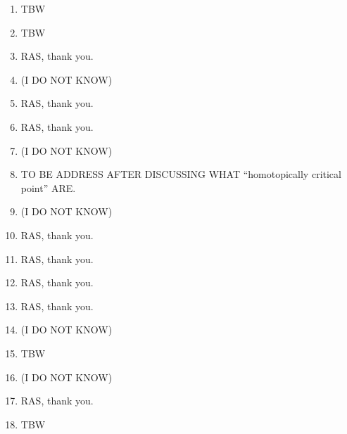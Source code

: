 \documentclass{article}
\begin{document}
\begin{enumerate}
		\item TBW
		\item TBW
		\item RAS, thank you.
		\item (I DO NOT KNOW)
		\item RAS, thank you.
		\item RAS, thank you.
		\item (I DO NOT KNOW)
		\item TO BE ADDRESS AFTER DISCUSSING WHAT ``homotopically critical point'' ARE.
		\item (I DO NOT KNOW)
		\item RAS, thank you.
		\item RAS, thank you.
		\item RAS, thank you.
		\item RAS, thank you.
		\item (I DO NOT KNOW)
		\item TBW
		\item (I DO NOT KNOW)
		\item RAS, thank you.
		\item TBW
	\end{enumerate}
\end{document}
